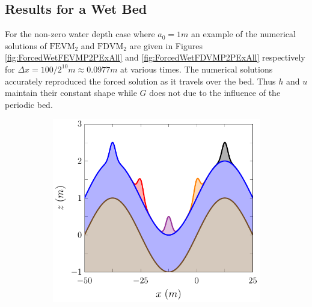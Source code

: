 \subsection{Results for a Wet Bed} 
For the non-zero water depth case where $a_0 = 1m$ an example of the numerical solutions of $\text{FEVM}_2$ and $\text{FDVM}_2$ are given in Figures \ref{fig:ForcedWetFEVMP2PExAll} and \ref{fig:ForcedWetFDVMP2PExAll} respectively for $\Delta x = 100/ 2^{10} m \approx 0.0977m $ at various times. The numerical solutions accurately reproduced the forced solution as it travels over the bed. Thus $h$ and $u$ maintain their constant shape while $G$ does not due to the influence of the periodic bed.
\begin{figure}
	\centering
	\begin{subfigure}{0.5\textwidth}
		\includegraphics[width=\textwidth]{./chp5/figures/Forced/Wet/FEVMw.pdf}
		\vspace{0.5cm}
	\end{subfigure}%
	\begin{subfigure}{0.5\textwidth}

\end{subfigure}
\end{figure}

